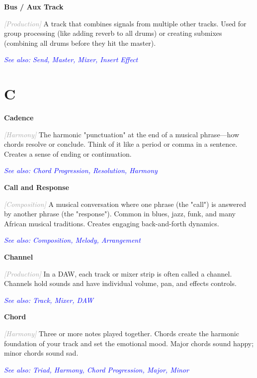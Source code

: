 \documentclass[11pt,letterpaper]{article}
\newcommand{\term}[1]{\textbf{\large\color{purple}#1}}
\newcommand{\category}[1]{\textcolor{darkgray}{\textit{\small [#1]}}}
\newcommand{\seealso}[1]{\textcolor{blue}{\textit{See also: #1}}}
\newenvironment{termdef}[1]
  {\noindent\term{#1}\par\nopagebreak}
  {\par\vspace{0.3em}}
\begin{document}
\begin{termdef}{Bus / Aux Track}
\category{Production}
A track that combines signals from multiple other tracks. Used for group processing (like adding reverb to all drums) or creating submixes (combining all drums before they hit the master).

\seealso{Send, Master, Mixer, Insert Effect}
\end{termdef}

\newpage


\section*{C}

\begin{termdef}{Cadence}
\category{Harmony}
The harmonic "punctuation" at the end of a musical phrase—how chords resolve or conclude. Think of it like a period or comma in a sentence. Creates a sense of ending or continuation.

\seealso{Chord Progression, Resolution, Harmony}
\end{termdef}

\begin{termdef}{Call and Response}
\category{Composition}
A musical conversation where one phrase (the "call") is answered by another phrase (the "response"). Common in blues, jazz, funk, and many African musical traditions. Creates engaging back-and-forth dynamics.

\seealso{Composition, Melody, Arrangement}
\end{termdef}

\begin{termdef}{Channel}
\category{Production}
In a DAW, each track or mixer strip is often called a channel. Channels hold sounds and have individual volume, pan, and effects controls.

\seealso{Track, Mixer, DAW}
\end{termdef}

\begin{termdef}{Chord}
\category{Harmony}
Three or more notes played together. Chords create the harmonic foundation of your track and set the emotional mood. Major chords sound happy; minor chords sound sad.

\seealso{Triad, Harmony, Chord Progression, Major, Minor}
\end{termdef}
\end{document}
